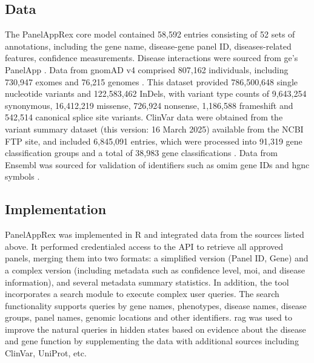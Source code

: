\subsection{Data}
The PanelAppRex core model contained 58,592 entries consisting of 52 sets of annotations, including the gene name, disease-gene panel ID, diseases-related features, confidence measurements.
Disease interactions were sourced from \ac{ge}’s PanelApp
\cite{martin_panelapp_2019}.
Data from gnomAD v4 comprised 807,162 individuals, including 730,947 exomes and 76,215 genomes \cite{karczewski2020mutational}. This dataset provided 786,500,648 single nucleotide variants and 122,583,462 InDels, with variant type counts of 9,643,254 synonymous, 16,412,219 missense, 726,924 nonsense, 1,186,588 frameshift and 542,514 canonical splice site variants. ClinVar data were obtained from the variant summary dataset (this version: 16 March 2025) available from the NCBI FTP site, and included 6,845,091 entries, which were processed into 91,319 gene classification groups and a total of 38,983 gene classifications 
\cite{landrum_clinvar_2018}. 
Data from Ensembl was sourced for validation of identifiers such as \ac{omim} gene IDs and \ac{hgnc} symbols
\cite{dyer_ensembl_2025}.

\subsection{Implementation}
\noindent
PanelAppRex was implemented in R and integrated data from the sources listed above.
It performed credentialed access to the API to retrieve all approved panels, merging them into two formats: a simplified version (Panel ID, Gene) and a complex version (including metadata such as confidence level, \ac{moi}, and disease information), and several metadata summary statistics. In addition, the tool incorporates a search module to execute complex user queries. The search functionality supports queries by gene names, phenotypes, disease names, disease groups, panel names, genomic locations and other identifiers. 
\ac{rag} was used to improve the natural queries in hidden states based on evidence about the disease and gene function by supplementing the data with additional sources including ClinVar, UniProt, etc. 

